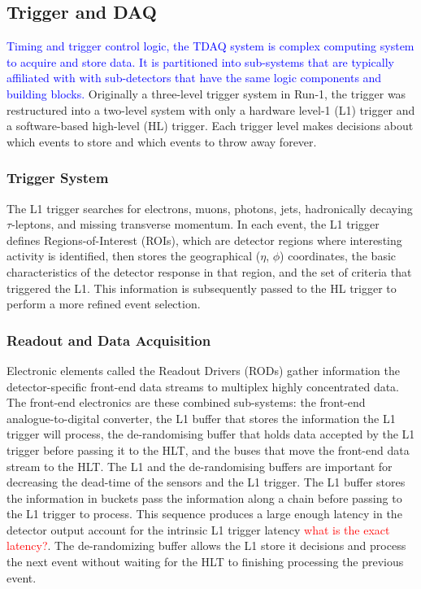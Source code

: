 \subsection{Trigger and DAQ}
\textcolor{blue}{Timing and  trigger control logic, the TDAQ system is complex computing system to acquire and store data.  It is partitioned into sub-systems that are typically affiliated with with sub-detectors that have the same logic components and building blocks.}  Originally a three-level trigger system in Run-1, the trigger was restructured into a two-level system with only a hardware level-1 (L1) trigger and a software-based high-level (HL) trigger.  Each trigger level makes decisions about which events to store and which events to throw away forever.

\subsubsection{Trigger System}
The L1 trigger searches for electrons, muons, photons, jets, hadronically decaying $\tau$-leptons, and missing transverse momentum.  In each event, the L1 trigger defines Regions-of-Interest (ROIs), which are detector regions where interesting activity is identified, then stores the geographical ($\eta$, $\phi$) coordinates, the basic characteristics of the detector response in that region, and the set of criteria that triggered the L1.  This information is subsequently passed to the HL trigger to perform a more refined event selection.

\subsubsection{Readout and Data Acquisition}

Electronic elements called the Readout Drivers (RODs) gather information the detector-specific front-end data streams to multiplex highly concentrated data.  The front-end electronics are these combined sub-systems: the front-end analogue-to-digital converter, the L1 buffer that stores the information the L1 trigger will process, the de-randomising buffer that holds data accepted by the L1 trigger before passing it to the HLT, and the buses that move the front-end data stream to the HLT.  The L1 and the de-randomising buffers are important for decreasing the dead-time of the sensors and the L1 trigger.  The L1 buffer stores the information in buckets pass the information along a chain before passing to the L1 trigger to process.  This sequence produces a large enough latency in the detector output account for the intrinsic L1 trigger latency \textcolor{red}{what is the exact latency?}. The de-randomizing buffer allows the L1 store it decisions and process the next event without waiting for the HLT to finishing processing the previous event.

